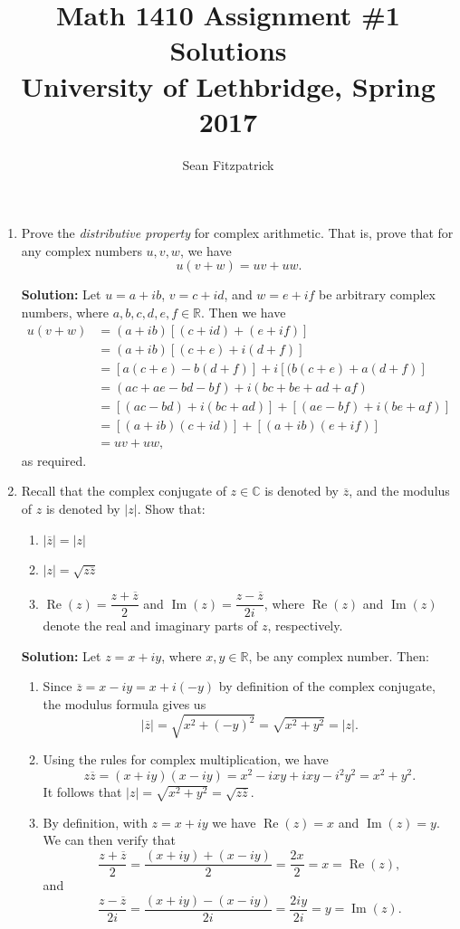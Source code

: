 \documentclass[letterpaper,12pt]{article}
\title{Math 1410 Assignment \#1 Solutions\\University of Lethbridge, Spring 2017}
\author{Sean Fitzpatrick}
\newcommand{\abs}[1]{\lvert #1\rvert}
\newcommand{\R}{\mathbb{R}}
\begin{document}
 \maketitle


\begin{enumerate}
\item Prove the \textit{distributive property} for complex arithmetic. That is, prove that for any complex numbers $u, v, w$, we have
\[
 u(v+w) = uv+uw.
\]

\medskip

{\bf Solution:} Let $u=a+ib$, $v=c+id$, and $w=e+if$ be arbitrary complex numbers, where $a,b,c,d,e,f\in\R$. Then we have
\begin{align*}
 u(v+w) & = (a+ib)[(c+id)+(e+if)]\\
& = (a+ib)[(c+e)+i(d+f)]\\
& = [a(c+e)-b(d+f)]+i[(b(c+e)+a(d+f)] \tag{using $i^2=-1$}\\
& = (ac+ae-bd-bf)+i(bc+be+ad+af)\\
& = [(ac-bd)+i(bc+ad)]+[(ae-bf)+i(be+af)] \tag{rearranging}\\
& = [(a+ib)(c+id)]+[(a+ib)(e+if)] \tag{reversing the definition of complex multiplication}\\
& = uv+uw,
\end{align*}
as required.

\bigskip

\item Recall that the complex conjugate of $z\in\mathbb{C}$ is denoted by $\overline{z}$, and the modulus of $z$ is denoted by $\abs{z}$. Show that:
\begin{enumerate}
 \item $\abs{\overline{z}} = \abs{z}$
 \item $\abs{z} = \sqrt{z\overline{z}}$
 \item $\operatorname{Re}(z) = \dfrac{z+\overline{z}}{2}$ and $\operatorname{Im}(z) = \dfrac{z-\overline{z}}{2i}$, where $\operatorname{Re}(z)$ and $\operatorname{Im}(z)$ denote the real and imaginary parts of $z$, respectively.
\end{enumerate}

\bigskip

{\bf Solution:} Let $z=x+iy$, where $x,y\in \R$, be any complex number. Then:
\begin{enumerate}
 \item Since $\overline{z}=x-iy=x+i(-y)$ by definition of the complex conjugate, the modulus formula gives us
\[
 \abs{\overline{z}} = \sqrt{x^2+(-y)^2} = \sqrt{x^2+y^2} = \abs{z}.
\]
 \item Using the rules for complex multiplication, we have
\[
 z\overline{z} = (x+iy)(x-iy) = x^2-ixy+ixy-i^2y^2 = x^2+y^2.
\]
It follows that $\abs{z} = \sqrt{x^2+y^2} = \sqrt{z\overline{z}}$.
 \item By definition, with $z=x+iy$ we have $\operatorname{Re}(z) = x$ and $\operatorname{Im}(z)=y$. We can then verify that
\[
 \frac{z+\overline{z}}{2} = \frac{(x+iy)+(x-iy)}{2} = \frac{2x}{2} = x = \operatorname{Re}(z),
\]
and
\[
 \frac{z-\overline{z}}{2i} = \frac{(x+iy)-(x-iy)}{2i} = \frac{2iy}{2i} = y = \operatorname{Im}(z).
\]


\end{enumerate}
\end{enumerate}
\end{document}
